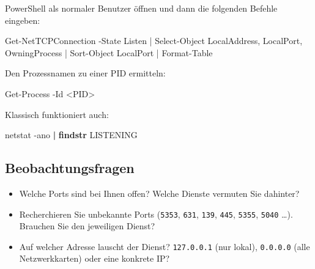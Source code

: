 \documentclass[
  nswissgerman,
  a4paper,
  DIV=11,
  numbers=noendperiod,
  ngerman]{scrreprt}
\newenvironment{Shaded}{\begin{snugshade}}{\end{snugshade}}
\newcommand{\AttributeTok}[1]{\textcolor[rgb]{0.40,0.45,0.13}{#1}}
\newcommand{\FunctionTok}[1]{\textcolor[rgb]{0.28,0.35,0.67}{#1}}
\newcommand{\KeywordTok}[1]{\textcolor[rgb]{0.00,0.23,0.31}{\textbf{#1}}}
\newcommand{\NormalTok}[1]{\textcolor[rgb]{0.00,0.23,0.31}{#1}}
\newcommand{\OperatorTok}[1]{\textcolor[rgb]{0.37,0.37,0.37}{#1}}
\providecommand{\tightlist}{%
  \setlength{\itemsep}{0pt}\setlength{\parskip}{0pt}}
\begin{document}
PowerShell als normaler Benutzer öffnen und dann die folgenden Befehle
eingeben:

\begin{Shaded}
\begin{Highlighting}[numbers=left,,]
\NormalTok{Get{-}NetTCPConnection }\OperatorTok{{-}}\NormalTok{State Listen }\OperatorTok{|}
  \FunctionTok{Select{-}Object}\NormalTok{ LocalAddress}\OperatorTok{,}\NormalTok{ LocalPort}\OperatorTok{,}\NormalTok{ OwningProcess }\OperatorTok{|}
  \FunctionTok{Sort{-}Object}\NormalTok{ LocalPort }\OperatorTok{|}
  \FunctionTok{Format{-}Table}
\end{Highlighting}
\end{Shaded}

Den Prozessnamen zu einer PID ermitteln:

\begin{Shaded}
\begin{Highlighting}[numbers=left,,]
\FunctionTok{Get{-}Process} \OperatorTok{{-}}\NormalTok{Id }\OperatorTok{\textless{}}\NormalTok{PID}\OperatorTok{\textgreater{}}
\end{Highlighting}
\end{Shaded}

Klassisch funktioniert auch:

\begin{Shaded}
\begin{Highlighting}[numbers=left,,]
\NormalTok{netstat }\AttributeTok{{-}ano} \KeywordTok{|} \KeywordTok{findstr}\NormalTok{ LISTENING}
\end{Highlighting}
\end{Shaded}

\subsection{Beobachtungsfragen}\label{beobachtungsfragen}

\begin{itemize}
\tightlist
\item
  Welche Ports sind bei Ihnen offen? Welche Dienste vermuten Sie
  dahinter?
\item
  Recherchieren Sie unbekannte Ports (\texttt{5353}, \texttt{631},
  \texttt{139}, \texttt{445}, \texttt{5355}, \texttt{5040} \ldots).
  Brauchen Sie den jeweiligen Dienst?
\item
  Auf welcher Adresse lauscht der Dienst? \texttt{127.0.0.1} (nur
  lokal), \texttt{0.0.0.0} (alle Netzwerkkarten) oder eine konkrete IP?
\end{itemize}
\end{document}
